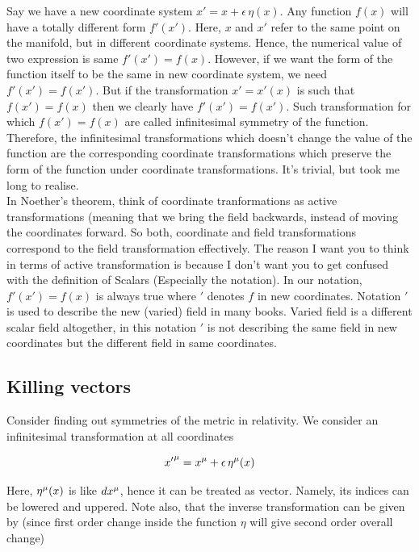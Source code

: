 \documentclass{report}
\begin{document}
\noindent Say we have a new coordinate system $x' = x + \epsilon \, \eta(x)$. Any function $f(x)$ will have a totally different form $f'(x')$. Here, $x$ and $x'$ refer to the same point on the manifold, but in different coordinate systems. Hence, the numerical value of two expression is same $f'(x') = f(x)$. However, if we want the form of the function itself to be the same in new coordinate system, we need $f'(x') = f(x')$. But if the transformation $x'=x'(x)$ is such that $f(x') = f(x)$ then we clearly have $f'(x') = f(x')$. Such transformation for which $f(x') = f(x)$ are called infinitesimal symmetry of the function. Therefore, the infinitesimal transformations which doesn't change the value of the function are the corresponding coordinate transformations which preserve the form of the function under coordinate transformations. It's trivial, but took me long to realise.\\

\noindent In Noether's theorem, think of coordinate tranformations as active transformations (meaning that we bring the field backwards, instead of moving the coordinates forward. So both, coordinate and field transformations correspond to the field transformation effectively. The reason I want you to think in terms of active transformation is because I don't want you to get confused with the definition of Scalars (Especially the notation). In our notation, $f'(x') = f(x)$ is always true where $'$ denotes $f$ in new coordinates. Notation $'$ is  used to describe the new (varied) field in many books. Varied field is a different scalar field altogether, in this notation $'$ is not describing the same field in new coordinates but the different field in same coordinates.

\subsection{Killing vectors}

Consider finding out symmetries of the metric in relativity. We consider an infinitesimal transformation at all coordinates

$${x'}\indices{^\mu} = x\indices{^\mu} + \epsilon \, \eta\indices{^\mu}(x)$$

\noindent Here, $\eta\indices{^\mu}(x)$ is like $dx\indices{^\mu}$, hence it can be treated as vector. Namely, its indices can be lowered and uppered. Note also, that the inverse transformation can be given by (since first order change inside the function $\eta$ will give second order overall change)
\end{document}
